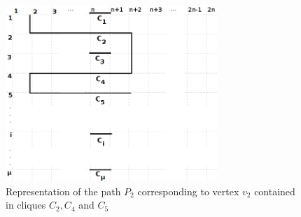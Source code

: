 \begin{figure}[htb]	
\center%
\includegraphics[width=8cm]{./img/grade3.png}
\caption{Representation of the path $P_2$ corresponding to vertex $v_2$ contained in cliques $C_2, C_4$ and $C_5$}
\label{fig:gradeDemonstracao}
\end{figure}